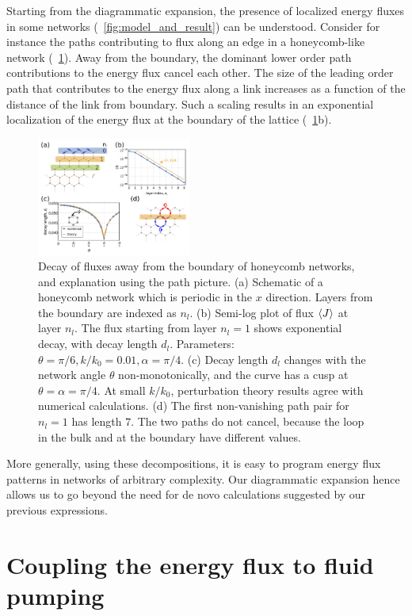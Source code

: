 \documentclass[
 preprint,
 preprintnumbers,
 amsmath,amssymb,
 aps,
 pre,
 longbibliography,
 superscriptaddress,
 10pt, twocolumn
]{revtex4-1}
\begin{document}
Starting from the  diagrammatic expansion, the presence of localized energy fluxes in some networks (\figurename~\ref{fig:model_and_result}) can be understood. Consider for instance the paths contributing to flux along an edge in a honeycomb-like network (\figurename~\ref{fig:path_decay}). Away from the boundary, the dominant lower order path contributions to the energy flux cancel each other. The size of the leading order path that contributes to the energy flux along a link increases as a function of the distance of the link from boundary. Such a scaling results in an exponential localization of the energy flux at the boundary of the lattice (\figurename~\ref{fig:path_decay}b).

\begin{figure}[ht]
	\centering
	\includegraphics[width=0.45\textwidth]{5_path_decay.pdf}
    \caption{Decay of fluxes away from the boundary of honeycomb networks, and explanation using the path picture.
    (a) Schematic of a honeycomb network which is periodic in the $x$ direction. Layers from the boundary are indexed as $n_l$.
    (b) Semi-log plot of flux $\expval{J}$ at layer $n_l$. The flux starting from layer $n_l=1$ shows exponential decay, with decay length $d_l$. Parameters: $\theta = \pi/6, k/k_0 = 0.01, \alpha = \pi/4$.
    (c) Decay length $d_l$ changes with the network angle $\theta$ non-monotonically, and the curve has a cusp at $\theta = \alpha = \pi/4$. At small $k/k_0$, perturbation theory results agree with numerical calculations.
    (d) The first non-vanishing path pair for $n_l=1$ has length $7$. The two paths do not cancel, because the loop in the bulk and at the boundary have different values.
    }
    \label{fig:path_decay}
\end{figure}

More generally, using these decompositions, it is easy to program energy flux patterns in networks of arbitrary complexity. Our diagrammatic expansion hence allows us to go beyond the need for de novo calculations suggested by our previous expressions.


\section{Coupling the energy flux to fluid pumping} \label{sec:swimmer}
\end{document}
